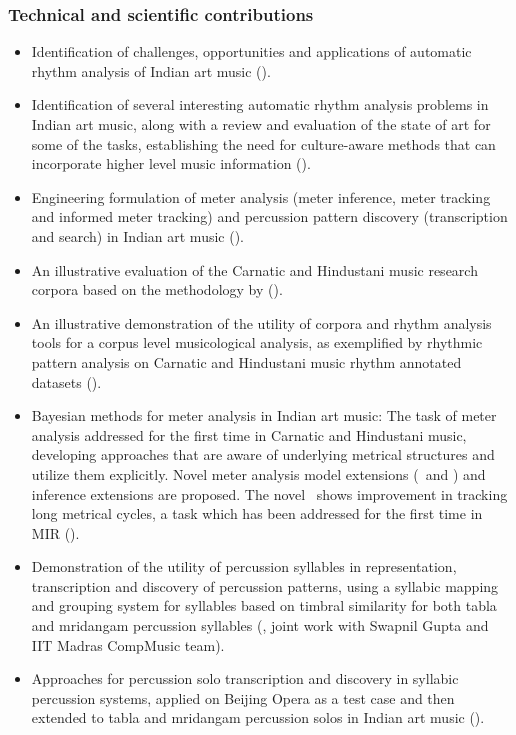 \subsubsection{Technical and scientific contributions}
\begin{itemize}[leftmargin=*]
	\item Identification of challenges, opportunities and applications of automatic rhythm analysis of Indian art music (). 
	\item Identification of several interesting automatic rhythm analysis problems in Indian art music, along with a review and evaluation of the state of art for some of the tasks, establishing the need for culture-aware methods that can incorporate higher level music information (). 
	\item Engineering formulation of meter analysis (meter inference, meter tracking and informed meter tracking) and percussion pattern discovery (transcription and search) in Indian art music (). 
	\item An illustrative evaluation of the Carnatic and Hindustani music research corpora based on the methodology by  (). 
	\item An illustrative demonstration of the utility of corpora and rhythm analysis tools for a corpus level musicological analysis, as exemplified by rhythmic pattern analysis on Carnatic and Hindustani music rhythm annotated datasets (). 
	\item Bayesian methods for meter analysis in Indian art music: The task of meter analysis addressed for the first time in Carnatic and Hindustani music, developing approaches that are aware of underlying metrical structures and utilize them explicitly. Novel meter analysis model extensions (\momodel\ and \spmodel) and inference extensions are proposed. The novel \spmodel\ shows improvement in tracking long metrical cycles, a task which has been addressed for the first time in \gls{MIR} ().
	\item Demonstration of the utility of percussion syllables in representation, transcription and discovery of percussion patterns, using a syllabic mapping and grouping system for syllables based on timbral similarity for both \gls{tabla} and mridangam percussion syllables (, joint work with Swapnil Gupta and IIT Madras CompMusic team). 
	\item Approaches for percussion solo transcription and discovery in syllabic percussion systems, applied on Beijing Opera as a test case and then extended to \gls{tabla} and mridangam percussion solos in Indian art music (). 
\end{itemize}
